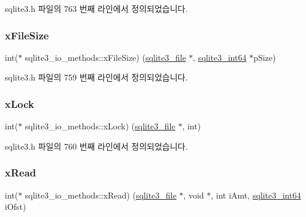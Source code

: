sqlite3.\+h 파일의 763 번째 라인에서 정의되었습니다.

\mbox{\label{structsqlite3__io__methods_ae875f158de72435f40ca0bd5207d9862}} 
\subsubsection{\texorpdfstring{x\+File\+Size}{xFileSize}}
{\footnotesize\ttfamily int($\ast$ sqlite3\+\_\+io\+\_\+methods\+::x\+File\+Size) (\hyperlink{structsqlite3__file}{sqlite3\+\_\+file} $\ast$, \hyperlink{sqlite3_8h_a0a4d3e6c1ad46f90e746b920ab6ca0d2}{sqlite3\+\_\+int64} $\ast$p\+Size)}



sqlite3.\+h 파일의 759 번째 라인에서 정의되었습니다.

\mbox{\label{structsqlite3__io__methods_ac88793475b0c4188fb02c229f1a11e8b}} 
\subsubsection{\texorpdfstring{x\+Lock}{xLock}}
{\footnotesize\ttfamily int($\ast$ sqlite3\+\_\+io\+\_\+methods\+::x\+Lock) (\hyperlink{structsqlite3__file}{sqlite3\+\_\+file} $\ast$, int)}



sqlite3.\+h 파일의 760 번째 라인에서 정의되었습니다.

\mbox{\label{structsqlite3__io__methods_ac1433ffc0da0414a2a67a46d338d83eb}} 
\subsubsection{\texorpdfstring{x\+Read}{xRead}}
{\footnotesize\ttfamily int($\ast$ sqlite3\+\_\+io\+\_\+methods\+::x\+Read) (\hyperlink{structsqlite3__file}{sqlite3\+\_\+file} $\ast$, void $\ast$, int i\+Amt, \hyperlink{sqlite3_8h_a0a4d3e6c1ad46f90e746b920ab6ca0d2}{sqlite3\+\_\+int64} i\+Ofst)}



